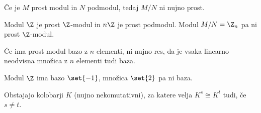 \begin{opomba}
    Če je $M$ prost modul in $N$ podmodul, tedaj $M/N$ ni nujno prost.
\end{opomba}

\begin{primer}
    Modul $\Z$ je prost $\Z$-modul in $n\Z$ je prost podmodul. Modul $M/N = \Z_n$ pa ni prost 
    $\Z$-modul.
\end{primer}

\begin{opomba}
    Če ima prost modul bazo z $n$ elementi, ni nujno res, da je vsaka linearno neodvisna 
    množica z $n$ elementi tudi baza.
\end{opomba}

\begin{primer}
    Modul $\Z$ ima bazo $\set{-1}$, množica $\set{2}$ pa ni baza.
\end{primer}

\begin{opomba}
    Obstajajo kolobarji $K$ (nujno nekomutativni), za katere velja $K^s \cong K^t$ tudi, če
    $s \neq t$.
\end{opomba}

